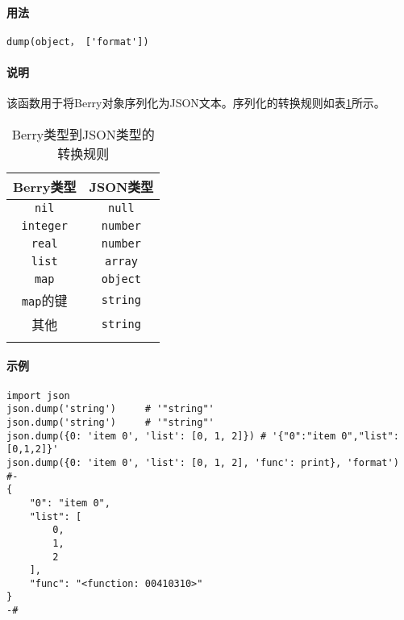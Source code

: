 
\paragraph{用法}
\begin{lstlisting}[language=berry, numbers=none]
dump(object， ['format'])
\end{lstlisting}

\paragraph{说明}
该函数用于将Berry对象序列化为JSON文本。序列化的转换规则如表\ref{tab::berry2json_rule}所示。
\begin{table}[htb]
    \centering
    \setlength{\tabcolsep}{18mm}
    \begin{tabular}{cc} \Xhline{1pt}
        \textbf{Berry类型} & \textbf{JSON类型} \\ \hline
        \texttt{nil} & \texttt{null} \\
        \texttt{integer} & \texttt{number} \\
        \texttt{real} & \texttt{number} \\
        \texttt{list} & \texttt{array} \\
        \texttt{map} & \texttt{object} \\
        \texttt{map}的键 & \texttt{string} \\
        其他 & \texttt{string} \\
        \Xhline{1pt}
    \end{tabular}
    \caption{Berry类型到JSON类型的转换规则}
    \label{tab::berry2json_rule}
\end{table}

\paragraph{示例}
\begin{lstlisting}[language=berry, numbers=none]
import json
json.dump('string')     # '"string"'
json.dump('string')     # '"string"'
json.dump({0: 'item 0', 'list': [0, 1, 2]}) # '{"0":"item 0","list":[0,1,2]}'
json.dump({0: 'item 0', 'list': [0, 1, 2], 'func': print}, 'format')
#-
{
    "0": "item 0",
    "list": [
        0,
        1,
        2
    ],
    "func": "<function: 00410310>"
}
-#
\end{lstlisting}


